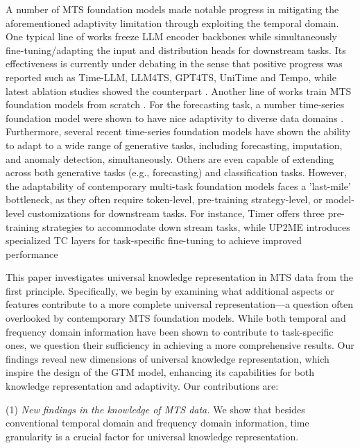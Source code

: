 A number of MTS foundation models 
made notable progress in mitigating 
the aforementioned adaptivity limitation 
through exploiting the temporal domain.  
One typical line of works freeze LLM encoder backbones while simultaneously fine-tuning/adapting the input and distribution heads for downstream tasks.  
Its effectiveness is currently under debating 
in the sense that positive progress was reported  
such as    
Time-LLM\cite{Jin2024}, LLM4TS\cite{Chang2024}, GPT4TS\cite{Zhou23}, UniTime\cite{Liu2024} and Tempo\cite{Cao2024}, 
while latest ablation studies showed the counterpart \cite{Tan2024}.  
Another line of works train MTS foundation models 
from scratch \cite{gao24,Liu24}. 
For the forecasting task,  
a number time-series foundation model were shown to 
have nice adaptivity to diverse data domains 
\cite{Rasul23,Ekambaram24,Shi24}. 
Furthermore, several recent time-series foundation models have shown the ability to adapt to a wide range of generative tasks, including forecasting, imputation, and anomaly detection, simultaneously\cite{Liu24,Zhang24}. Others are even capable of extending across both generative tasks (e.g., forecasting) and classification tasks\cite{Dong24,Kamarthi23}.
However, the adaptability of contemporary multi-task foundation models faces a 'last-mile' bottleneck, as they often require token-level, pre-training strategy-level, or model-level customizations for downstream tasks.  
For instance, Timer\cite{Liu24} offers three pre-training strategies to accommodate down stream tasks, while UP2ME\cite{Zhang24} introduces specialized TC layers for task-specific fine-tuning to achieve improved performance


This paper investigates universal knowledge representation in MTS data from the first principle. Specifically, we begin by examining what additional aspects or features contribute to a more complete universal representation—a question often overlooked by contemporary MTS foundation models. While both temporal and frequency domain information have been shown to contribute to task-specific ones, we question their sufficiency in achieving a more comprehensive results. Our findings reveal new dimensions of universal knowledge representation, which inspire the design of the GTM model, enhancing its capabilities for both knowledge representation and adaptivity.   
Our contributions are:   
 
(1) \textit{New findings in the knowledge of MTS data.} 
We show that besides conventional temporal domain and frequency domain information, 
time granularity is a crucial factor for universal 
knowledge representation.  


